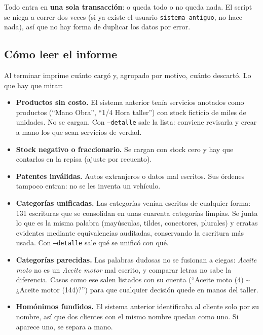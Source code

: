 \documentclass[11pt,a4paper]{article}
\begin{document}
Todo entra en \textbf{una sola transacción}: o queda todo o no queda nada. El
script se niega a correr dos veces (si ya existe el usuario
\texttt{sistema\_antiguo}, no hace nada), así que no hay forma de duplicar los
datos por error.

\subsection{Cómo leer el informe}

Al terminar imprime cuánto cargó y, agrupado por motivo, cuánto descartó. Lo que
hay que mirar:

\begin{itemize}
  \item \textbf{Productos sin costo.} El sistema anterior tenía servicios
        anotados como productos (``Mano Obra'', ``1/4 Hora taller'') con stock
        ficticio de miles de unidades. No se cargan. Con \texttt{--detalle} sale
        la lista: conviene revisarla y crear a mano los que sean servicios de
        verdad.
  \item \textbf{Stock negativo o fraccionario.} Se cargan con stock cero y hay
        que contarlos en la repisa (ajuste por recuento).
  \item \textbf{Patentes inválidas.} Autos extranjeros o datos mal escritos. Sus
        órdenes tampoco entran: no se les inventa un vehículo.
  \item \textbf{Categorías unificadas.} Las categorías venían escritas de
        cualquier forma: 131 escrituras que se consolidan en unas cuarenta
        categorías limpias. Se junta lo que es la misma palabra (mayúsculas,
        tildes, conectores, plurales) y erratas evidentes mediante equivalencias
        auditadas, conservando la escritura más usada. Con \texttt{--detalle}
        sale qué se unificó con qué.
  \item \textbf{Categorías parecidas.} Las palabras dudosas no se fusionan a ciegas:
        \emph{Aceite moto} no es un \emph{Aceite motor} mal escrito, y
        comparar letras no sabe la diferencia. Casos como ese salen listados con
        su cuenta (``Aceite moto (4) \textasciitilde{} ¿Aceite motor (144)?'')
        para que cualquier decisión quede en manos del taller.
  \item \textbf{Homónimos fundidos.} El sistema anterior identificaba al cliente
        solo por su nombre, así que dos clientes con el mismo nombre quedan como
        uno. Si aparece uno, se separa a mano.
\end{itemize}
\end{document}
